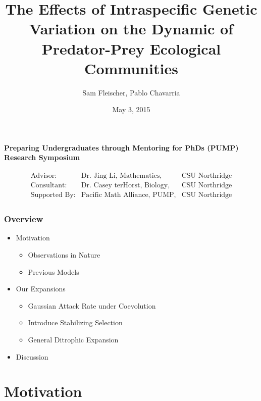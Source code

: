 \documentclass[10pt]{beamer}
\title{The Effects of Intraspecific Genetic Variation on the Dynamic of Predator-Prey Ecological Communities}
\author{\vspace{-15pt} Sam Fleischer, Pablo Chavarria}
\date{\vspace{-5pt} May 3, 2015}
\begin{document}
\begin{frame}
	\titlepage
	\begin{center}
		{\bf Preparing Undergraduates through Mentoring for PhDs (PUMP) Research Symposium}
	\end{center}
	\begin{align*}
		\begin{array}{lll}
		\text{Advisor:} & \text{Dr. Jing Li, Mathematics,} & \text{CSU Northridge} \\
		\text{Consultant:} & \text{Dr. Casey terHorst, Biology,} & \text{CSU Northridge} \\
		\text{Supported By:} & \text{Pacific Math Alliance, PUMP,} & \text{CSU Northridge}
		\end{array}
	\end{align*}
\end{frame}

\begin{frame}
	\frametitle{Overview}
	\begin{itemize}
		\item Motivation
		\begin{itemize}
			\item Observations in Nature
			\item Previous Models
		\end{itemize}
		\item Our Expansions
		\begin{itemize}
			\item Gaussian Attack Rate under Coevolution
			\item Introduce Stabilizing Selection
			\item General Ditrophic Expansion
		\end{itemize}
		\item Discussion
	\end{itemize}
\end{frame}

\section{Motivation}
\end{document}
